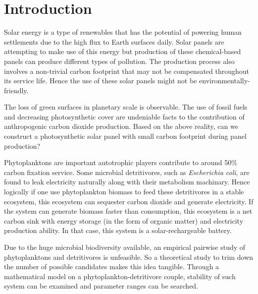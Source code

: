 \documentclass[../thesis.tex]{subfiles} %
\begin{document}
\section{Introduction}

Solar energy is a type of renewables that has the potential of powering human settlements due to the high flux to Earth surfaces daily.  Solar panels are attempting to make use of this energy but production of these chemical-based panels can produce different types of pollution.  The production process also involves a non-trivial carbon footprint that may not be compensated throughout its service life.  Hence the use of these solar panels might not be environmentally-friendly.

The loss of green surfaces in planetary scale is observable.  The use of fossil fuels and decreasing photosynthetic cover are undeniable facts to the contribution of anthropogenic carbon dioxide production.  Based on the above reality, can we construct a photosynthetic solar panel with small carbon footprint during panel production?

Phytoplanktons are important autotrophic players contribute to around 50\% carbon fixation service.  Some microbial detritivores, such as \textit{Escherichia coli}, are found to leak electricity naturally along with their metabolism machinary.  Hence logically if one use phytoplankton biomass to feed these detritivores in a stable ecosystem, this ecosystem can sequester carbon dioxide and generate electricity.  If the system can generate biomass faster than consumption, this ecosystem is a net carbon sink with energy storage (in the form of organic matter) and electricity production ability.  In that case, this system is a solar-rechargeable battery.

Due to the huge microbial biodiversity available, an empirical pairwise study of phytoplanktons and detritivores is unfeasible.  So a theoretical study to trim down the number of possible candidates makes this idea tangible.  Through a mathematical model on a phytoplankton-detritivore couple, stability of such system can be examined and parameter ranges can be searched.

\end{document}
